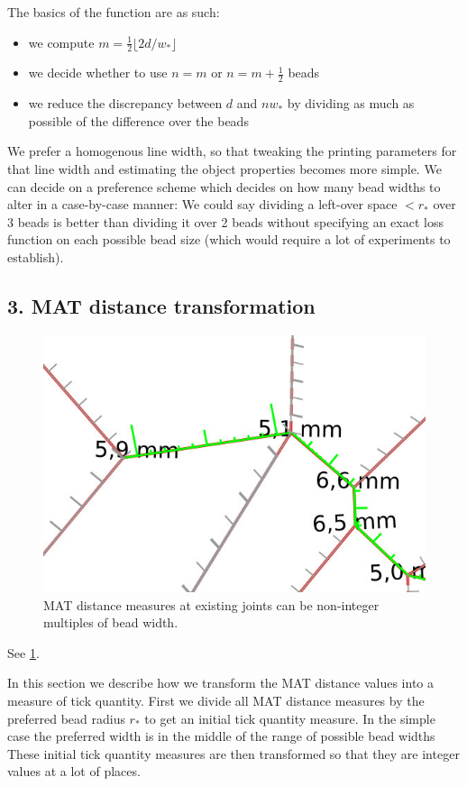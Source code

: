 The basics of the function are as such:
\begin{itemize}
\item we compute $m = \frac12 \lfloor 2 d / w_* \rfloor$
\item we decide whether to use $n = m$ or $n = m+\frac12$ beads
\item we reduce the discrepancy between $d$ and $nw_*$ by dividing as much as possible of the difference over the beads
\end{itemize}

We prefer a homogenous line width, so that tweaking the printing parameters for that line width and estimating the object properties becomes more simple.
We can decide on a preference scheme which decides on how many bead widths to alter in a case-by-case manner:
We could say dividing a left-over space $<r_*$ over 3 beads is better than dividing it over 2 beads without specifying an exact loss function on each possible bead size (which would require a lot of experiments to establish).





\subsection{3. MAT distance transformation}

\begin{figure}
\centering
\includegraphics[width=.6\columnwidth]{sources/method/rounded_dist_measures.jpg}
\caption{MAT distance measures at existing joints can be non-integer multiples of bead width.}
\label{rounded_dist_measures}
\end{figure}

See \cref{rounded_dist_measures}.

In this section we describe how we transform the MAT distance values into a measure of tick quantity.
First we divide all MAT distance measures by the preferred bead radius $r_*$ to get an initial tick quantity measure.
In the simple case the preferred width is in the middle of the range of possible bead widths
These initial tick quantity measures are then transformed so that they are integer values at a lot of places.



